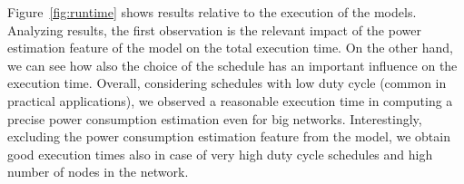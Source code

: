 Figure~\ref{fig:runtime} shows results relative to the execution of the models.
Analyzing results, the first observation is the relevant impact of the power estimation feature of the model on the total execution time.
On the other hand, we can see how also the choice of the schedule has an important influence on the execution time.
Overall, considering schedules with low duty cycle (common in practical applications), we observed a reasonable execution time in computing a precise power consumption estimation even for big networks.
Interestingly, excluding the power consumption estimation feature from the model, we obtain good execution times also in case of very high duty cycle schedules and high number of nodes in the network.
 



